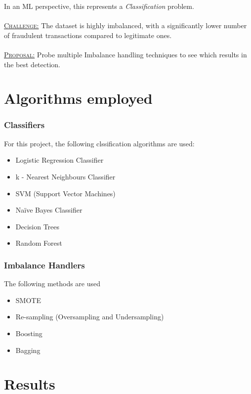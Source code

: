 \documentclass[12pt,a4paper]{article}
\begin{document}
In an ML perspective, this represents a \emph{Classification} problem.\\\\
\uline{\textsc{Challenge:}} The dataset is highly imbalanced, with a significantly lower number of fraudulent transactions compared to legitimate ones.\\\\
\uline{\textsc{Proposal:}} Probe multiple Imbalance handling techniques to see which results in the best detection.


\section{Algorithms employed}
\subsubsection{Classifiers}
For this project, the following clssification algorithms are used:
\begin{itemize}
    \item Logistic Regression Classifier
    \item k - Nearest Neighbours Classifier
    \item SVM (Support Vector Machines)
    \item Naïve Bayes Classifier
    \item Decision Trees
    \item Random Forest
\end{itemize}

\subsubsection{Imbalance Handlers}
The following methods are used
\begin{itemize}
    \item SMOTE
    \item Re-sampling (Oversampling and Undersampling)
    \item Boosting
    \item Bagging
    
\end{itemize}

\section{Results}\label{sec:result}
\end{document}
